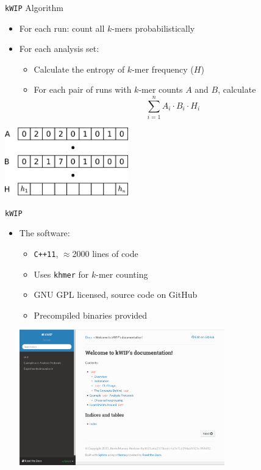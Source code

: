 \documentclass[t]{beamer}
\begin{document}
\begin{frame}{\texttt{kWIP} Algorithm}
  \begin{itemize}
    \item For each run: count all $k$-mers probabilistically
    \item For each analysis set:
      \begin{itemize}
        \item Calculate the entropy of $k$-mer frequency ($H$)
        \item For each pair of runs with $k$-mer counts $A$ and $B$, calculate
          $$\sum\limits^{n}_{i=1} A_i \cdot B_i \cdot H_i$$
      \end{itemize}
  \end{itemize}
  \begin{center}
    \includegraphics[width=0.4\textwidth]{img/hash-wip.png}
  \end{center}
\end{frame}

\begin{frame}{\texttt{kWIP}}
  \begin{itemize}
    \item The software:
      \begin{itemize}
        \item \texttt{C++11}, $\approx$2000 lines of code
        \item Uses \texttt{khmer} for $k$-mer counting
        \item GNU GPL licensed, source code on GitHub
        \item Precompiled binaries provided
      \end{itemize}
      \begin{center}
        \includegraphics[width=0.7\textwidth]{img/kwip-doc-screenshot.png}
      \end{center}
  \end{itemize}
\end{frame}
\end{document}
